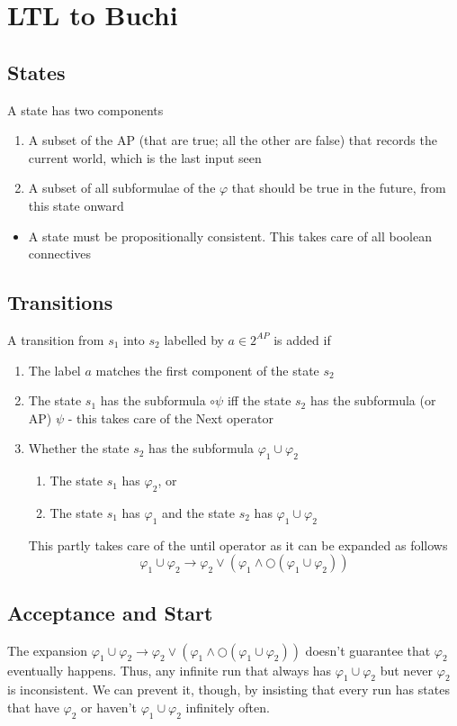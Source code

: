 \documentclass{article}[18pt]
\begin{document}
\section{LTL to Buchi}
\subsection{States}
A state has two components
\begin{enumerate}
	\item A subset of the AP (that are true; all the other are false) that records the current world, which is the last input seen
	\item A subset of all subformulae of the $\varphi$ that should be true in the future, from this state onward
\end{enumerate}
\begin{itemize}
	\item A state must be propositionally consistent. This takes care of all boolean connectives
\end{itemize}
\subsection{Transitions}
A transition from $s_1$ into $s_2$ labelled by $a\in 2^{AP}$ is added if
\begin{enumerate}
	\item The label $a$ matches the first component of the state $s_2$
	\item The state $s_1$ has the subformula $\circ\psi$ iff the state $s_2$ has the subformula (or AP) $\psi$ - this takes care of the Next operator
	\item Whether the state $s_2$ has the subformula $\varphi_1\cup \varphi_2$
	\begin{enumerate}
		\item The state $s_1$ has $\varphi_2$, or
		\item The state $s_1$ has $\varphi_1$ and the state $s_2$ has $\varphi_1\cup \varphi_2$
	\end{enumerate}
	This partly takes care of the until operator as it can be expanded as follows
	\[
	\varphi_{1} \cup \varphi_{2} \rightarrow \varphi_{2} \vee\left(\varphi_{1} \wedge \bigcirc\left(\varphi_{1} \cup \varphi_{2}\right)\right)
	\]
\end{enumerate}
\subsection{Acceptance and Start}
The expansion \(
\varphi_{1} \cup \varphi_{2} \rightarrow \varphi_{2} \vee\left(\varphi_{1} \wedge \bigcirc\left(\varphi_{1} \cup \varphi_{2}\right)\right)
\)
doesn't guarantee that $\varphi_2$ eventually happens. Thus, any infinite run that always has $\varphi_{1}\cup\varphi_{2}$ but never $\varphi_{2}$ is inconsistent. We can prevent it, though, by insisting that every run has states that have $\varphi_{2}$ or haven't $\varphi_{1}\cup \varphi_{2}$ infinitely often.
\end{document}
